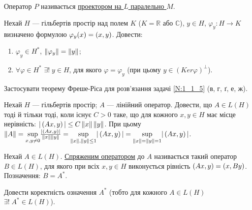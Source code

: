 \begin{theory}
    Оператор $P$ називається \uline{проектором на $L$ паралельно $M$}.
\end{theory}

\begin{exercise}
    Нехай $H$ --- гільбертів простір над полем $K$ ($K=\mathbb{R}$ 
    або $\mathbb{C}$), $y \in H$, $\varphi_y : H \rightarrow K$ визначено 
    формулою $\varphi_y(x) = \left(x, y\right)$. Довести:
    \begin{enumerate}[label=\ukr*)]
        \item $\varphi_y \in H^*$, $\left\lVert\varphi_y\right\rVert = \left\lVert y\right\rVert$;
        \item $\forall \varphi \in H^*$ $\exists! \; y\in H$, для якого 
        $\varphi = \varphi_y$ (при цьому $y\in(Ker\varphi)^\bot$).
    \end{enumerate}
\end{exercise}

\begin{exercise}
    Застосувати теорему Фреше-Ріса для розв'язання задачі \ref{N:1_1_5}
    (в, г, ґ, е, ж).
\end{exercise}

\begin{exercise}
    Нехай $H$ --- гільбертів простір; $A$ --- лінійний оператор. 
    Довести, що $A \in L(H)$ тоді й тільки тоді, коли існує 
    $C > 0$ таке, що для кожного $x, y \in H$ має місце нерівність:
    $|\left(Ax, y\right)| \leq C\left\lVert x\right\rVert\left\lVert y\right\rVert$. При цьому $\left\lVert A\right\rVert = 
    \underset{x,y \neq 0}{\sup} \frac{|\left(Ax, y\right)|}{\left\lVert x\right\rVert\left\lVert y\right\rVert}
    =\underset{\left\lVert x\right\rVert,\left\lVert y\right\rVert \leq 1}{\sup} |\left(Ax, y\right)| = 
    \underset{\left\lVert x\right\rVert = \left\lVert y\right\rVert = 1}{\sup} |\left(Ax, y\right)|$.
\end{exercise}

\begin{theory}
    Нехай $A \in L(H)$. \uline{Спряженим оператором} до $A$ називається 
    такий оператор $B \in L(H)$, для якого при всіх $x, y \in H$ 
    виконується рівність $\left(Ax, y\right) = \left(x, By\right)$. 
    Позначення: $B = A^*$. 
\end{theory}

\begin{exercise}
    Довести коректність означення $A^*$ (тобто для кожного $A\in L(H)$ 
    $\exists! \; A^* \in L(H)$).
\end{exercise}

